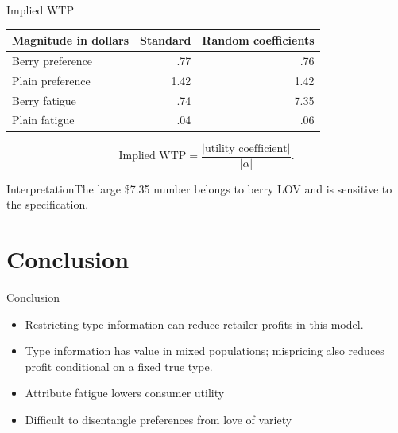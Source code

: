\documentclass[aspectratio=169,11pt]{beamer}
\begin{document}
\begin{frame}{Implied WTP}
\centering\begin{tabular}{lrr}\toprule
Magnitude in dollars & Standard & Random coefficients\\\midrule
Berry preference & .77 & .76\\
Plain preference & 1.42 & 1.42\\
Berry fatigue & .74 & 7.35\\
Plain fatigue & .04 & .06\\\bottomrule\end{tabular}
\[
\text{Implied WTP}=\frac{|\text{utility coefficient}|}{|\alpha|}.
\]
\begin{block}{Interpretation}The large \$7.35 number belongs to berry LOV and is sensitive to the specification.\end{block}
\end{frame}

\section{Conclusion}
\begin{frame}{Conclusion}
\begin{itemize}
\item Restricting type information can reduce retailer profits in this model.
\item Type information has value in mixed populations; mispricing also reduces profit conditional on a fixed true type.
\item Attribute fatigue lowers consumer utility
\item Difficult to disentangle preferences from love of variety
\end{itemize}
\end{frame}

\appendix
{}
\end{document}
